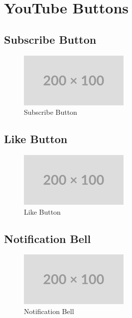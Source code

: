 \chapter{YouTube Buttons}

\section{Subscribe Button}

\begin{figure}[ht]
    \centering
    \includegraphics{Images/200-100.png}
    \caption{Subscribe Button}
    \label{fig:Subscribe}
\end{figure}

\section{Like Button}
\begin{figure}[ht]
    \centering
    \includegraphics{Images/200-100.png}
    \caption{Like Button}
    \label{fig:Like}
\end{figure}
\section{Notification Bell}
\begin{figure}[ht]
    \centering
    \includegraphics{Images/200-100.png}
    \caption{Notification Bell}
    \label{fig:Notification}
\end{figure}